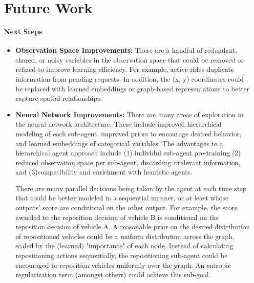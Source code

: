 \documentclass[11pt]{article}
\begin{document}
\section{Future Work}

\paragraph{Next Steps}

\begin{itemize}
		\item \textbf{Observation Space Improvements:} There are a handful of redundant, shared, or noisy variables
				in the observation space that could be removed or refined to improve learning efficiency. For example,
				active rides duplicate information from pending requests. In addition, the (x, y) coordinates could be
				replaced with learned embeddings or graph-based representations to better capture spatial relationships.
		\item \textbf{Neural Network Improvements:} There are many areas of exploration in the neural network
				architecture. These include improved hierarchical modeling of each sub-agent, improved priors to
				encourage desired behavior, and learned embeddings of categorical variables. The advantages to a
				hierarchical agent approach include (1) individul sub-agent pre-training (2) reduced observation space
				per sub-agent, discarding irrelevant information, and (3)compatibility and enrichment with heuristic agents.

				There are many parallel decisions being taken by the agent at each time step that could be better
				modeled in a sequential manner, or at least whose outputs' score are conditional on the other output. For
				example, the score awarded to the reposition decision of vehicle B is conditional on the reposition
				decision of vehicle A. A reasonable prior on the desired distribution of repositioned vehicles could be a
				uniform distribution across the graph, scaled by the (learned) "importance" of each node. Instead of
				calculating repositioning actions sequentially, the repositioning sub-agent could be encouraged to
				reposition vehicles uniformly over the graph. An entropic regularization term (amongst others) could
				achieve this sub-goal.


\end{itemize}
\end{document}
